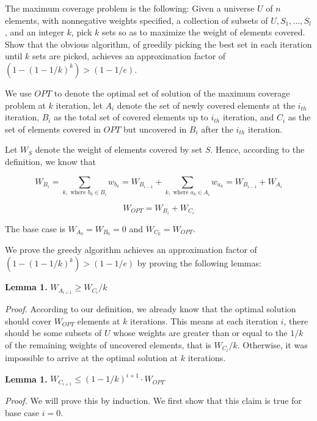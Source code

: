 \newpage
{} %

\problemdes

The maximum coverage problem is the following: Given a universe $U$ of $n$ elements, with nonnegative weights specified, a collection of subsets of $U, S_1, \dots,S_l$, and an integer $k$, pick $k$ sets so as to maximize the weight of elements covered. Show that the obvious algorithm, of greedily picking the best set in each iteration until $k$ sets are picked, achieves an approximation factor of $\left(1-(1-1 / k)^{k}\right)>(1-1 / e)$.

\solution


We use $OPT$ to denote the optimal set of solution of the maximum coverage problem at $k$ iteration, let $A_i$ denote the set of newly covered elements at the $i_{th}$ iteration, $B_i$ as the total set of covered elements up to $i_{th}$ iteration, and $C_i$ as the set of elements covered in $OPT$ but uncovered in $B_i$ after the $i_{th}$ iteration. 

Let $W_S$ denote the weight of elements covered by set $S$. Hence, according to the definition, we know that

$$W_{B_i}= \sum_{k, \text{ where } b_k\in B_i} w_{b_k} = W_{B_{i-1}}+ \sum_{k, \text{ where } a_k \in A_{i}} w_{a_k} = W_{B_{i-1}}+ W_{A_i}$$

$$W_{OPT} = W_{B_i} + W_{C_i}$$

The base case is $W_{A_0} = W_{B_0} = 0$ and $W_{C_0} = W_{OPT}$.

We prove the greedy algorithm achieves an approximation factor of $\left(1-(1-1 / k)^{k}\right)>(1-1 / e)$ by proving the following lemmas:

\textbf{Lemma 1.} $W_{A_{i+1}} \ge W_{C_i}/k$

\textit{Proof.} According to our definition, we already know that the optimal solution should cover $W_{OPT}$ elements at $k$ iterations. This means at each iteration $i$, there should be some subsets of $U$ whose weights are greater than or equal to the $1/k$ of the remaining weights of uncovered elements, that is $W_{C_i}/k$. Otherwise, it was impossible to arrive at the optimal solution at $k$ iterations.

\textbf{Lemma 1.} $W_{C_{i+1}} \le (1-1/k)^{i+1} \cdot W_{OPT}$

\textit{Proof.} We will prove this by induction. We first show that this claim is true for base case $i=0$.

